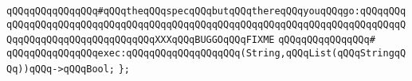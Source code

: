 \verb|qQQqqQQqqQQqqQQq#qQQqtheqQQqspecqQQqbutqQQqthereqQQqyouqQQqgo:qQQqqQQqqQQqqQQqqQQqqQQqqQQqqQQqqQQqqQQqqQQqqQQqqQQqqQQqqQQqqQQqqQQqqQQqqQQqqQQqqQQqqQQqqQQqqQQqqQQqqQQqXXXqQQqBUGGOqQQqFIXME|\newline
\verb|qQQqqQQqqQQqqQQq#|\newline
\verb|qQQqqQQqqQQqqQQqexec:qQQqqQQqqQQqqQQqqQQq(String,qQQqList(qQQqStringqQQq))qQQq->qQQqBool;|\newline
\verb|};|\newline
\newline
\newline
\newline
\newline
\newline
\newline
\newline

